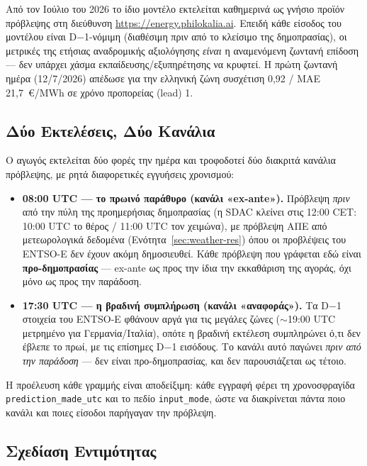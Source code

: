 Από τον Ιούλιο του 2026 το ίδιο μοντέλο εκτελείται καθημερινά ως γνήσιο προϊόν πρόβλεψης στη διεύθυνση \url{https://energy.philokalia.ai}. Επειδή κάθε είσοδος του μοντέλου είναι D$-$1-νόμιμη (διαθέσιμη πριν από το κλείσιμο της δημοπρασίας), οι μετρικές της ετήσιας αναδρομικής αξιολόγησης \emph{είναι} η αναμενόμενη ζωντανή επίδοση --- δεν υπάρχει χάσμα εκπαίδευσης/εξυπηρέτησης να κρυφτεί. Η πρώτη ζωντανή ημέρα (12/7/2026) απέδωσε για την ελληνική ζώνη συσχέτιση 0,92 / MAE 21,7~€/MWh σε χρόνο προπορείας (lead) 1.

\subsection{Δύο Εκτελέσεις, Δύο Κανάλια}
\label{subsec:two-tracks}

Ο αγωγός εκτελείται δύο φορές την ημέρα και τροφοδοτεί δύο διακριτά κανάλια πρόβλεψης, με ρητά διαφορετικές εγγυήσεις χρονισμού:

\begin{itemize}
\item \textbf{08:00 UTC --- το πρωινό παράθυρο (κανάλι «ex-ante»).} Πρόβλεψη \emph{πριν} από την πύλη της προημερήσιας δημοπρασίας (η SDAC κλείνει στις 12:00 CET: 10:00 UTC το θέρος / 11:00 UTC τον χειμώνα), με πρόβλεψη ΑΠΕ από μετεωρολογικά δεδομένα (Ενότητα~\ref{sec:weather-res}) όπου οι προβλέψεις του ENTSO-E δεν έχουν ακόμη δημοσιευθεί. Κάθε πρόβλεψη που γράφεται εδώ είναι \textbf{προ-δημοπρασίας} --- ex-ante ως προς την ίδια την εκκαθάριση της αγοράς, όχι μόνο ως προς την παράδοση.
\item \textbf{17:30 UTC --- η βραδινή συμπλήρωση (κανάλι «αναφοράς»).} Τα D$-$1 στοιχεία του ENTSO-E φθάνουν αργά για τις μεγάλες ζώνες ($\sim$19:00 UTC μετρημένο για Γερμανία/Ιταλία), οπότε η βραδινή εκτέλεση συμπληρώνει ό,τι δεν έβλεπε το πρωί, με τις επίσημες D$-$1 εισόδους. Το κανάλι αυτό παγώνει \emph{πριν από την παράδοση} --- δεν είναι προ-δημοπρασίας, και δεν παρουσιάζεται ως τέτοιο.
\end{itemize}

Η προέλευση κάθε γραμμής είναι αποδείξιμη: κάθε εγγραφή φέρει τη χρονοσφραγίδα \texttt{prediction\_made\_utc} και το πεδίο \texttt{input\_mode}, ώστε να διακρίνεται πάντα ποιο κανάλι και ποιες είσοδοι παρήγαγαν την πρόβλεψη.

\subsection{Σχεδίαση Εντιμότητας}
\label{subsec:honesty-design}

